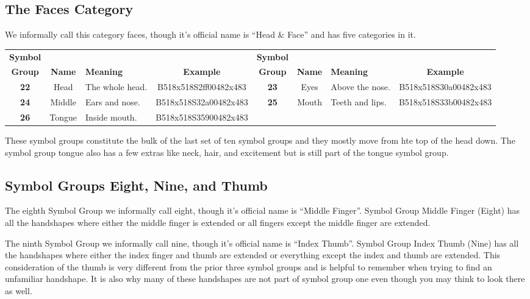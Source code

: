 \documentclass{article}
\begin{document}
\subsection{The Faces Category}

We informally call this category faces, though it's official name is ``Head \& Face'' and has five categories in it.

\begin{center}
\begin{tabular}{ccp{21mm}c@{\hskip 5mm}ccp{21mm}c}
\textbf{Symbol}&&&&\textbf{Symbol}\\
\textbf{Group}&\textbf{Name}&\textbf{Meaning}&\textbf{Example}&\textbf{Group}&\textbf{Name}&\textbf{Meaning}&\textbf{Example}\\
\textbf{22}&Head  &The whole head.&B518x518S2ff00482x483&\textbf{23}&Eyes &Above the nose.&B518x518S30a00482x483\\
\textbf{24}&Middle&Ears and nose. &B518x518S32a00482x483&\textbf{25}&Mouth&Teeth and lips.&B518x518S33b00482x483\\
\textbf{26}&Tongue&Inside mouth.  &B518x518S35900482x483\\
\end{tabular}
\end{center}

These symbol groups constitute the bulk of the last set of ten symbol groups and they mostly move from hte top of the head down.
The symbol group tongue also has a few extras like neck, hair, and excitement but is still part of the tongue symbol group.

\subsection{Symbol Groups Eight, Nine, and Thumb}

The eighth Symbol Group we informally call eight, though it's official name is ``Middle Finger''.
Symbol Group Middle Finger (Eight) has all the handshapes where either the middle finger is extended or all fingers except the middle finger are extended.

The ninth Symbol Group we informally call nine, though it's official name is ``Index Thumb''.
Symbol Group Index Thumb (Nine) has all the handshapes where either the index finger and thumb are extended or everything except the index and thumb are extended.
This consideration of the thumb is very different from the prior three symbol groups and is helpful to remember when trying to find an unfamiliar handshape.
It is also why many of these handshapes are not part of symbol group one even though you may think to look there as well.
\end{document}
